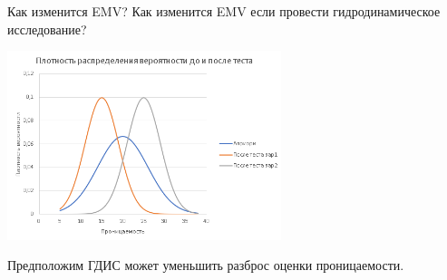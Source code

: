 \begin{frame}{Как изменится EMV?}
	Как изменится EMV если провести гидродинамическое исследование?
	\begin{center}
		\includegraphics[width=0.6\textwidth]{pics_2/norm_distribution_ex1}
	\end{center}
	Предположим ГДИС может уменьшить разброс оценки проницаемости.
\end{frame}


	



